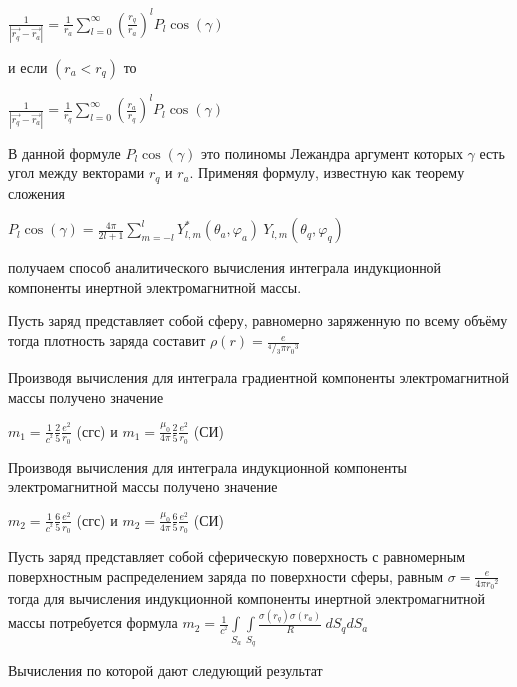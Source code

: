 \documentclass{article}
\begin{document}
$\frac{1}{\left| \overrightarrow{{{r}_{q}}}-\overrightarrow{{{r}_{a}}} \right|}=\frac{1}{{{r}_{a}}}\sum\limits_{l=0}^{\infty }{{{\left( \frac{{{r}_{q}}}{{{r}_{a}}} \right)}^{l}}{{P}_{l}} \cos \left( \gamma  \right)}$

и если $\left( {{r}_{a}}<{{r}_{q}} \right)$ то

$\frac{1}{\left| \overrightarrow{{{r}_{q}}}-\overrightarrow{{{r}_{a}}} \right|}=\frac{1}{{{r}_{q}}}\sum\limits_{l=0}^{\infty }{{{\left( \frac{{{r}_{a}}}{{{r}_{q}}} \right)}^{l}}{{P}_{l}} \cos \left( \gamma  \right)}$

В данной формуле ${{P}_{l}} \cos \left( \gamma  \right)$ это полиномы Лежандра аргумент которых $\gamma$ есть угол между векторами ${{r}_{q}}$  и ${{r}_{a}}$. Применяя формулу, известную как теорему сложения

${{P}_{l}}\cos \left( \gamma  \right)=\frac{4\pi }{2l+1}\sum\limits_{m=-l}^{l}{Y_{l,m}^{*}\left( {{\theta }_{a}},{{\varphi }_{a}} \right)}\ {{Y}_{l,m}}\left( {{\theta }_{q}},{{\varphi }_{q}} \right)$

получаем способ аналитического вычисления интеграла индукционной компоненты инертной электромагнитной массы.

Пусть заряд представляет собой сферу, равномерно заряженную по всему объёму тогда плотность заряда составит $\rho \left( r \right)=\frac{e}{{}^{4}/{}_{3}\pi {{r}_{0}}^{3}}$

Производя вычисления для интеграла градиентной компоненты электромагнитной массы получено значение

$m_1 =\frac{1}{{{c}^{^{2}}}}\frac{2}{5}\frac{e^2}{{{r}_{0}}}$ (сгс) и
$m_1 =\frac{{{\mu }_{0}}}{4\pi }\frac{2}{5}\frac{e^2}{{{r}_{0}}}$ (СИ)

Производя вычисления для интеграла индукционной компоненты электромагнитной массы получено значение

$m_2 =\frac{1}{{{c}^{^{2}}}}\frac{6}{5}\frac{e^2}{{{r}_{0}}}$ (сгс) и
$m_2 =\frac{{{\mu }_{0}}}{4\pi }\frac{6}{5}\frac{e^2}{{{r}_{0}}}$ (СИ)

Пусть заряд представляет собой сферическую поверхность с равномерным поверхностным распределением заряда по поверхности сферы, равным $\sigma=\frac{e}{4\pi {{r}_{0}}^{2}}$ тогда для вычисления индукционной компоненты инертной электромагнитной массы потребуется формула
$m_2=\frac{1}{{{c}^{^{2}}}}\int\limits_{{{S}_{a}}}{\int\limits_{{{S}_{q}}}{\frac{\sigma \left( {{r}_{q}} \right)\sigma \left( {{r}_{a}} \right)}{R}}}\ d{{S}_{q}}d{{S}_{a}}$

Вычисления по которой дают следующий результат
\end{document}
